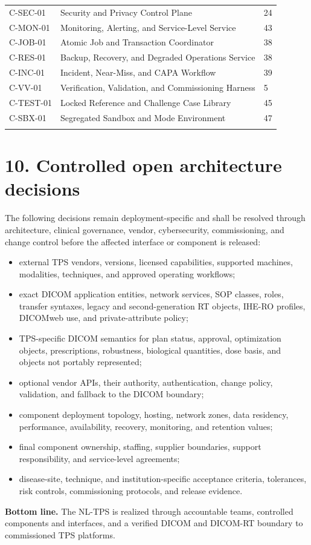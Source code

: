 \documentclass[11pt,letterpaper]{article}
\begin{document}
\begin{small}
\begin{longtable}{@{}L{0.16\textwidth}L{0.58\textwidth}L{0.18\textwidth}@{}}
\addlinespace[2pt]
C-SEC-01 & Security and Privacy Control Plane & 24 \\
\addlinespace[2pt]
C-MON-01 & Monitoring, Alerting, and Service-Level Service & 43 \\
\addlinespace[2pt]
C-JOB-01 & Atomic Job and Transaction Coordinator & 38 \\
\addlinespace[2pt]
C-RES-01 & Backup, Recovery, and Degraded Operations Service & 38 \\
\addlinespace[2pt]
C-INC-01 & Incident, Near-Miss, and CAPA Workflow & 39 \\
\addlinespace[2pt]
C-VV-01 & Verification, Validation, and Commissioning Harness & 5 \\
\addlinespace[2pt]
C-TEST-01 & Locked Reference and Challenge Case Library & 45 \\
\addlinespace[2pt]
C-SBX-01 & Segregated Sandbox and Mode Environment & 47 \\
\addlinespace[2pt]
\end{longtable}
\end{small}

\section{10. Controlled open architecture decisions}
The following decisions remain deployment-specific and shall be resolved through architecture, clinical governance, vendor, cybersecurity, commissioning, and change control before the affected interface or component is released:
\begin{itemize}
\item external TPS vendors, versions, licensed capabilities, supported machines, modalities, techniques, and approved operating workflows;
\item exact DICOM application entities, network services, SOP classes, roles, transfer syntaxes, legacy and second-generation RT objects, IHE-RO profiles, DICOMweb use, and private-attribute policy;
\item TPS-specific DICOM semantics for plan status, approval, optimization objects, prescriptions, robustness, biological quantities, dose basis, and objects not portably represented;
\item optional vendor APIs, their authority, authentication, change policy, validation, and fallback to the DICOM boundary;
\item component deployment topology, hosting, network zones, data residency, performance, availability, recovery, monitoring, and retention values;
\item final component ownership, staffing, supplier boundaries, support responsibility, and service-level agreements;
\item disease-site, technique, and institution-specific acceptance criteria, tolerances, risk controls, commissioning protocols, and release evidence.
\end{itemize}

\textbf{Bottom line. }The NL-TPS is realized through accountable teams, controlled components and interfaces, and a verified DICOM and DICOM-RT boundary to commissioned TPS platforms.
\end{document}
